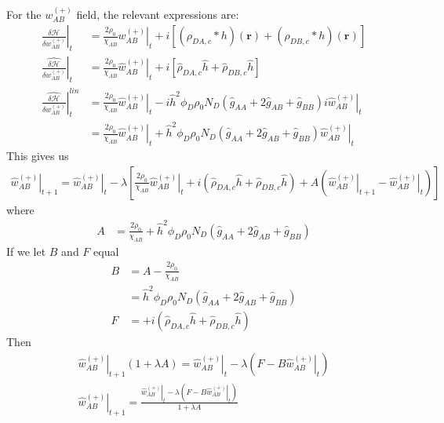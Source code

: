 \documentclass{article}
\begin{document}
  For the $w_{AB}^{(+)}$ field, the relevant expressions are:
  \begin{align*}
    \left. \frac{\delta \mathcal{H}}{\delta  w_{AB}^{(+)} } \right|_t &=
      \frac{2\rho_0}{\chi_{AB}} \left. w_{AB}^{(+)} \right|_t
      + i [ (\rho_{DA,c} \ast h)(\mathbf{r})
            + (\rho_{DB,c} \ast h)(\mathbf{r}) ] \\
      \left. \hat{\frac{\delta \mathcal{H}}{\delta w_{AB}^{(+)}}} \right|_t &=
      \frac{2\rho_0}{\chi_{AB}} \left. \hat{w}_{AB}^{(+)} \right|_t
      + i [ \hat{\rho}_{DA,c} \hat{h}
            + \hat{\rho}_{DB,c} \hat{h} ] \\
    \left. \hat{\frac{\delta \mathcal{H}}{\delta w_{AB}^{(+)}}} \right| ^{lin}_t &=
      \frac{2\rho_0}{\chi_{AB}} \left. \hat{w}_{AB}^{(+)} \right|_t
      - i \hat{h}^2 \phi_D \rho_0 N_D
        (\hat{g}_{AA} + 2 \hat{g}_{AB} + \hat{g}_{BB}) i \left.
          \hat{w}_{AB}^{(+)} \right|_t \\
    &= \frac{2\rho_0}{\chi_{AB}} \left. \hat{w}_{AB}^{(+)} \right|_t
      + \hat{h}^2 \phi_D \rho_0 N_D
        (\hat{g}_{AA} + 2 \hat{g}_{AB} + \hat{g}_{BB})
          \left. \hat{w}_{AB}^{(+)} \right|_t
  \end{align*}
  This gives us
  \begin{align*}
    \left. \hat{w}_{AB}^{(+)} \right|_{t+1} =
      \left. \hat{w}_{AB}^{(+)} \right|_t - \lambda \left[
        \frac{2\rho_0}{\chi_{AB}} \left. \hat{w}_{AB}^{(+)} \right|_t
        + i ( \hat{\rho}_{DA,c} \hat{h}
              + \hat{\rho}_{DB,c} \hat{h} )
        + A ( \left. \hat{w}_{AB}^{(+)} \right|_{t+1}
              - \left. \hat{w}_{AB}^{(+)} \right|_t)
      \right]
  \end{align*}
  where
  \begin{align*}
    A &=
    \frac{2\rho_0}{\chi_{AB}}
        + \hat{h}^2 \phi_D \rho_0 N_D
          (\hat{g}_{AA} + 2 \hat{g}_{AB} + \hat{g}_{BB})
  \end{align*}
  If we let $B$ and $F$ equal
  \begin{align*}
    B &= A - \frac{2\rho_0}{\chi_{AB}} \\
      &= \hat{h}^2 \phi_D \rho_0 N_D
          (\hat{g}_{AA} + 2 \hat{g}_{AB} + \hat{g}_{BB}) \\
    F &= + i ( \hat{\rho}_{DA,c} \hat{h}
              + \hat{\rho}_{DB,c} \hat{h} )
  \end{align*}
  Then
  \begin{align*}
    \left. \hat{w}_{AB}^{(+)} \right|_{t+1} ( 1 + \lambda A ) =
      \left. \hat{w}_{AB}^{(+)} \right|_t
      - \lambda \left( F - B \left. \hat{w}_{AB}^{(+)} \right|_t \right) \\
    \left. \hat{w}_{AB}^{(+)} \right|_{t+1} =
    \frac{\left. \hat{w}_{AB}^{(+)} \right|_t - \lambda
            \left( F - B \left. \hat{w}_{AB}^{(+)} \right|_t \right)}
         {1 + \lambda A}
  \end{align*}
  
\end{document}
